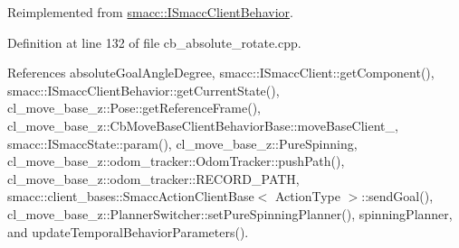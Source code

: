 Reimplemented from \hyperlink{classsmacc_1_1ISmaccClientBehavior_a9877684b1954429719826e2d0924d980}{smacc\+::\+I\+Smacc\+Client\+Behavior}.



Definition at line 132 of file cb\+\_\+absolute\+\_\+rotate.\+cpp.



References absolute\+Goal\+Angle\+Degree, smacc\+::\+I\+Smacc\+Client\+::get\+Component(), smacc\+::\+I\+Smacc\+Client\+Behavior\+::get\+Current\+State(), cl\+\_\+move\+\_\+base\+\_\+z\+::\+Pose\+::get\+Reference\+Frame(), cl\+\_\+move\+\_\+base\+\_\+z\+::\+Cb\+Move\+Base\+Client\+Behavior\+Base\+::move\+Base\+Client\+\_\+, smacc\+::\+I\+Smacc\+State\+::param(), cl\+\_\+move\+\_\+base\+\_\+z\+::\+Pure\+Spinning, cl\+\_\+move\+\_\+base\+\_\+z\+::odom\+\_\+tracker\+::\+Odom\+Tracker\+::push\+Path(), cl\+\_\+move\+\_\+base\+\_\+z\+::odom\+\_\+tracker\+::\+R\+E\+C\+O\+R\+D\+\_\+\+P\+A\+TH, smacc\+::client\+\_\+bases\+::\+Smacc\+Action\+Client\+Base$<$ Action\+Type $>$\+::send\+Goal(), cl\+\_\+move\+\_\+base\+\_\+z\+::\+Planner\+Switcher\+::set\+Pure\+Spinning\+Planner(), spinning\+Planner, and update\+Temporal\+Behavior\+Parameters().


